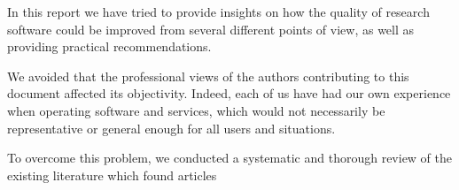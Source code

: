 In this report we have tried to provide insights on how the quality of research software could be improved from several different points of view, as well as providing practical recommendations.

We avoided that the professional views of the authors contributing to this document affected its objectivity. Indeed, each of us have had our own experience when operating software and services, which would not necessarily be representative or general enough for all users and situations.

To overcome this problem, we conducted a systematic and thorough review of the existing literature which found articles 